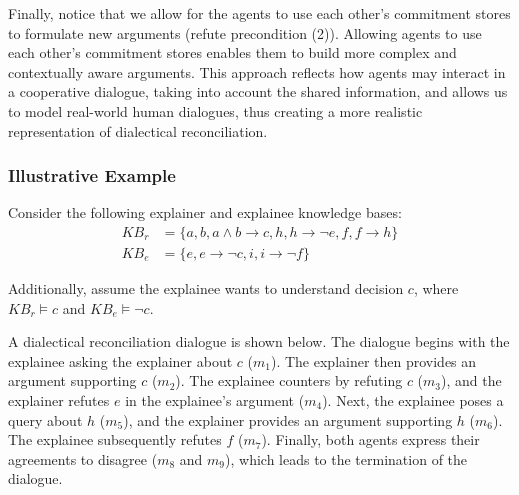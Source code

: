 \documentclass[letterpaper]{article} %
\begin{document}
 Finally, notice that we allow for the agents to use each other's commitment stores to formulate new arguments (\mbox{refute} precondition (2)). Allowing agents to use each other's commitment stores enables them to build more complex and contextually aware arguments. This approach reflects how agents may interact in a cooperative dialogue, taking into account the shared information, and allows us to model real-world human dialogues, thus creating a more realistic representation of dialectical reconciliation.


\subsubsection{Illustrative Example}
\label{example}


Consider the following explainer and explainee knowledge bases:
\begin{align*}
      KB_r &= \{ a,b,a\land b \!\rightarrow\! c, h, h\!\rightarrow\!\neg e, f, f \!\rightarrow\! h\} \\
    KB_e &= \{e, e \!\rightarrow\! \neg c, i, i\!\rightarrow\! \neg f \}
\end{align*}

\noindent Additionally, assume the explainee wants to understand decision $c$, where $KB_r \models c$ and $KB_e \models \neg c$. 






A dialectical reconciliation dialogue is shown below. The dialogue begins with the explainee asking the explainer about $c$ ($m_1$). The explainer then provides an argument \mbox{support}ing $c$ ($m_2$). The explainee counters by refuting $c$ ($m_3$), and the explainer \mbox{refute}s $e$ in the explainee's argument ($m_4$). Next, the explainee poses a \mbox{query} about $h$ ($m_5$), and the explainer provides an argument \mbox{support}ing $h$ ($m_6$). The explainee subsequently \mbox{refute}s $f$ ($m_7$). Finally, both agents express their agreements to disagree ($m_8$ and $m_9$), which leads to the termination of the dialogue.
\end{document}
